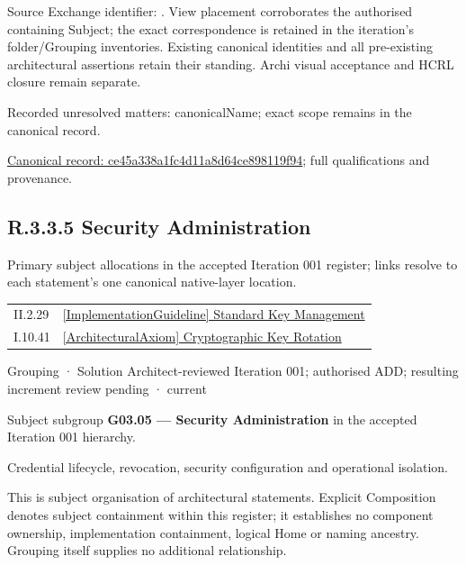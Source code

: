 Source Exchange identifier: \texttt{}. View placement corroborates
the authorised containing Subject; the exact correspondence is retained in the
iteration's folder/Grouping inventories. Existing canonical identities and all
pre-existing architectural assertions retain their standing. Archi visual
acceptance and HCRL closure remain separate.


{\small Recorded unresolved matters: canonicalName; exact scope remains in the canonical record.}\par
{\footnotesize \href{../../../../continuum/grouping/ce45a338a1fc4d11a8d64ce898119f94.md}{Canonical record: ce45a338a1fc4d11a8d64ce898119f94}; full qualifications and provenance.}\par
\subsection*{R.3.3.5 Security Administration}
\label{navigation:R.3.3.5}

Primary subject allocations in the accepted Iteration 001 register; links resolve to each statement’s one canonical native-layer location.\par
\begin{longtable}{p{.22\linewidth}p{.73\linewidth}}
II.2.29 & \hyperref[element:bbedb1ff13e94a88ac7ec60b8e40092e]{[ImplementationGuideline] Standard Key Management} \\
I.10.41 & \hyperref[element:6df99d4979a942fe833e1c43317b385b]{[ArchitecturalAxiom] Cryptographic Key Rotation} \\
\end{longtable}
\label{element:84693ef7bb4a4ced9634737c6bd5a36d}
{\small Grouping · Solution Architect-reviewed Iteration 001; authorised ADD; resulting increment review pending · current}\par

Subject subgroup \textbf{G03.05 — Security Administration} in the accepted Iteration 001 hierarchy.



Credential lifecycle, revocation, security configuration and operational isolation.



This is subject organisation of architectural statements. Explicit Composition denotes subject containment within this register; it establishes no component ownership, implementation containment, logical Home or naming ancestry. Grouping itself supplies no additional relationship.


